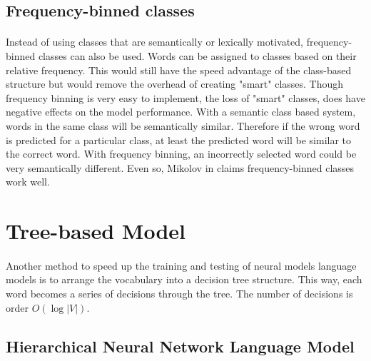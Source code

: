 \subsection{Frequency-binned classes} \label{sec:frequencybinning}
\paragraph{}
Instead of using classes that are semantically or lexically motivated, frequency-binned classes can also be used. Words can be assigned to classes based on their relative frequency. This would still have the speed advantage of the class-based structure but would remove the overhead of creating "smart" classes. Though frequency binning is very easy to implement, the loss of "smart" classes, does have negative effects on the model performance. With a semantic class based system, words in the same class will be semantically similar. Therefore if the wrong word is predicted for a particular class, at least the predicted word will be similar to the correct word. With frequency binning, an incorrectly selected word could be very semantically different. Even so, Mikolov in \cite{Mikolov2012} claims frequency-binned classes work well. 

\section{Tree-based Model}
\paragraph{}
Another method to speed up the training and testing of neural models language models is to arrange the vocabulary into a decision tree structure. This way, each word becomes a series of decisions through the tree. The number of decisions is order $O(\log|V|)$.

\subsection{Hierarchical Neural Network Language Model}
